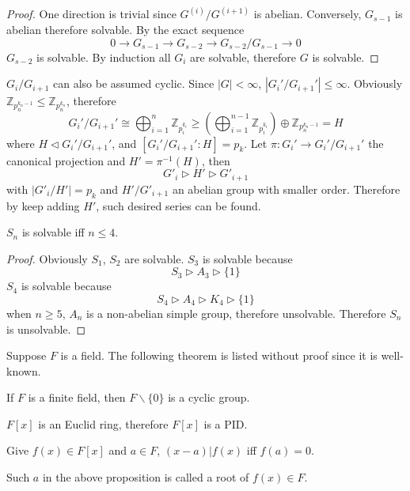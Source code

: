 \begin{proof}
    One direction is trivial since $G^{(i)}/G^{(i+1)}$ is abelian. Conversely, $G_{s-1}$ is abelian therefore solvable. By the exact sequence
    $$0\to G_{s-1}\to G_{s-2}\to G_{s-2}/G_{s-1}\to 0$$
    $G_{s-2}$ is solvable. By induction all $G_i$ are solvable, therefore $G$ is solvable.
\end{proof}
\begin{remark}
    $G_i/G_{i+1}$ can also be assumed cyclic. Since $|G|<\infty$, $|G_i'/G_{i+1}'|\le\infty$. Obviously $\mathbb{Z}_{p_n^{k_n-1}}\le\mathbb{Z}_{p_n^{k_n}}$, therefore
    $$
    G_i'/G_{i+1}'\cong\bigoplus^{n}_{i=1}\mathbb{Z}_{p_i^{k_i}}\ge\left(\bigoplus^{n-1}_{i=1}\mathbb{Z}_{p_i^{k_i}}\right)\oplus\mathbb{Z}_{p_n^{k_n-1}}=H
    $$
    where $H\triangleleft G_i'/G_{i+1}'$, and $[G_i'/G_{i+1}':H]=p_k$. Let $\pi:G_i'\to G_i'/G_{i+1}'$ the canonical projection and $H'=\pi^{-1}(H)$, then
    $$
    G'_i\triangleright H'\triangleright G'_{i+1}
    $$
    with $|G'_i/H'|=p_k$ and $H'/G'_{i+1}$ an abelian group with smaller order. Therefore by keep adding $H'$, such desired series can be found.
\end{remark}
\begin{proposition}
    $S_n$ is solvable iff $n\le 4$.
\end{proposition}
\begin{proof}
    Obviously $S_1$, $S_2$ are solvable. $S_3$ is solvable because
    $$
    S_3\triangleright A_3\triangleright\{1\}
    $$
    $S_4$ is solvable because
    $$
    S_4\triangleright A_4\triangleright K_4\triangleright\{1\}
    $$
    when $n\ge 5$, $A_n$ is a non-abelian simple group, therefore unsolvable. Therefore $S_n$ is unsolvable.
\end{proof}
\begin{remark}
    Suppose $F$ is a field. The following theorem is listed without proof since it is well-known.
\end{remark}
\begin{proposition}
    If $F$ is a finite field, then $F\backslash\{0\}$ is a cyclic group.
\end{proposition}
\begin{theorem}
        $F[x]$ is an Euclid ring, therefore $F[x]$ is a PID.
\end{theorem}
\begin{proposition}
    Give $f(x)\in F[x]$ and $a\in F$, $(x-a)|f(x)$ iff $f(a)=0$.
\end{proposition}
\begin{remark}
    Such $a$ in the above proposition is called a root of $f(x)\in F$.
\end{remark}
\newpage